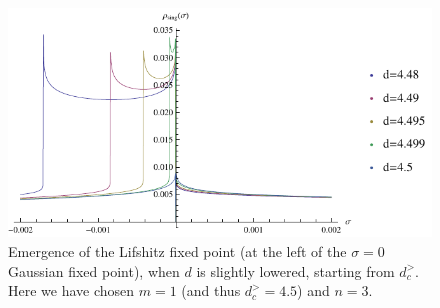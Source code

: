 \begin{figure}[htp]
\begin{center}
\includegraphics[scale=1]{img/chap4/emergence_lif.pdf}
\caption{Emergence of the Lifshitz fixed point (at the left of the $\sigma = 0$ Gaussian fixed point), when $d$ is slightly lowered, starting from $d_c^>$. Here we have chosen $m=1$ (and thus $d_c^> = 4.5$) and $n=3$.}
\label{fig:emergence_lif}
\end{center}
\end{figure}

